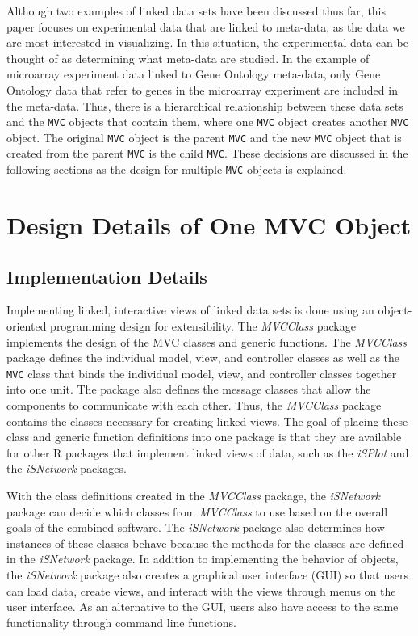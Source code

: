 \documentclass{article}[11pt]
\newcommand{\Robject}[1]{{\texttt{#1}}}
\newcommand{\Rpackage}[1]{{\textit{#1}}}
\newcommand{\Rclass}[1]{\texttt{#1}}
\begin{document}
Although two examples of linked data sets have been discussed thus far,
this paper focuses on experimental data that are linked to meta-data, as
the data we are most interested in visualizing.  In this situation, the
experimental data can be thought of as determining what meta-data are studied.
In the example of microarray experiment data linked to Gene Ontology
meta-data, only Gene Ontology data that refer to genes in the microarray
experiment are included in the meta-data.  Thus, there is a hierarchical
relationship between these data sets and the \Robject{MVC} objects that
contain them, where one \Robject{MVC} object creates another \Robject{MVC}
object.  The original \Robject{MVC} object is the parent \Robject{MVC} and the
new \Robject{MVC} object that is created from the parent \Robject{MVC} is the
child \Robject{MVC}.  These decisions are discussed in the following sections
as the design for multiple \Robject{MVC} objects is explained. 

\section{Design Details of One MVC Object}\label{Sec:OneMVC}

\subsection{Implementation Details}\label{SSec:OneOver}

Implementing linked, interactive views of linked data sets is done using an
object-oriented programming design for extensibility.  The \Rpackage{MVCClass}
package implements the design of the MVC classes and generic functions.  The
\Rpackage{MVCClass} package defines the individual model,
view, and controller classes as well as the \Rclass{MVC}
class that binds the individual model, view, and
controller classes together into one unit.  The package also defines
the message classes that allow the components to communicate with
each other.  Thus, the \Rpackage{MVCClass} package contains the classes
necessary for creating linked views.   The goal of placing these class and
generic function definitions into one package is that they are available for
other R packages that implement linked views of data, such as the
\Rpackage{iSPlot} and the \Rpackage{iSNetwork} packages. 

With the class definitions created in the \Rpackage{MVCClass} package, the
\Rpackage{iSNetwork} package can decide which classes from \Rpackage{MVCClass}
to use based on the overall goals of the combined software.  The
\Rpackage{iSNetwork} package also determines how instances of these classes
behave because the methods for the classes are defined in the
\Rpackage{iSNetwork} package.  In addition to implementing the behavior of
objects, the \Rpackage{iSNetwork} package also creates a graphical user
interface (GUI) so that users can load data, create views, and interact with
the views through menus on the user interface.  As an alternative to the GUI,
users also have access to the same functionality through command line
functions.  
\end{document}

